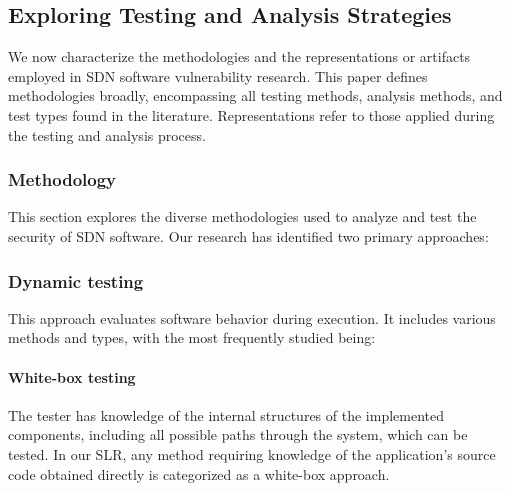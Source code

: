 \begin{adjustbox}{width=\linewidth}
\end{adjustbox}

\subsection{Exploring Testing and Analysis Strategies}
We now characterize the methodologies and the representations or artifacts employed in SDN software vulnerability research. This paper defines methodologies broadly, encompassing all testing methods, analysis methods, and test types found in the literature. Representations refer to those applied during the testing and analysis process.
\subsubsection{Methodology} 
This section explores the diverse methodologies used to analyze and test the security of SDN software. Our research has identified two primary approaches:
\subsubsection*{Dynamic testing} 
This approach evaluates software behavior during execution. It includes various methods and types, with the most frequently studied being:

\paragraph{White-box testing} The tester has knowledge of the internal structures of the implemented components, including all possible paths through the system, which can be tested. In our SLR, any method requiring knowledge of the application's source code obtained directly is categorized as a white-box approach.

